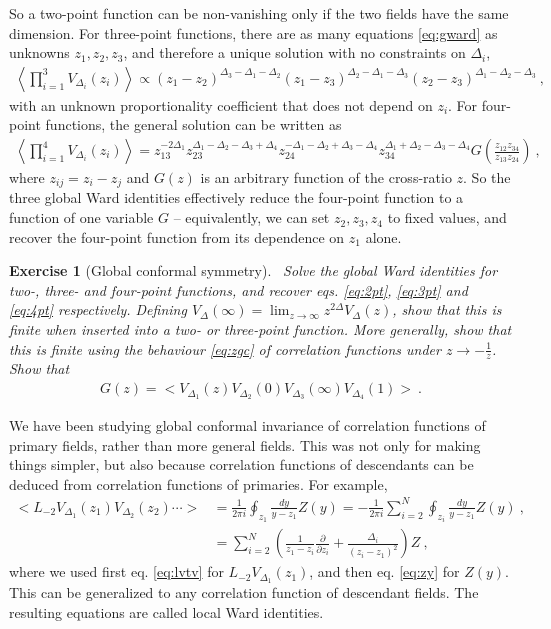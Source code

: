 \documentclass[12pt, a4paper]{article}
\theoremstyle{break}
\newtheorem{exo}{Exercise}[section]
\begin{document}
So a two-point function can be non-vanishing only if the two fields have the same dimension.
For three-point functions, there are as many equations \eqref{eq:gward} as unknowns $z_1,z_2,z_3$, and therefore a unique solution with no constraints on $\Delta_i$,
\begin{align}
 \left< \prod_{i=1}^3 V_{\Delta_i}(z_i) \right> \propto (z_1-z_2)^{\Delta_3-\Delta_1-\Delta_2} (z_1-z_3)^{\Delta_2-\Delta_1-\Delta_3} (z_2-z_3)^{\Delta_1-\Delta_2-\Delta_3}\ ,
 \label{eq:3pt}
\end{align}
with an unknown proportionality coefficient that does not depend on $z_i$.
For four-point functions, the general solution can be written as 
\begin{align}
 \left< \prod_{i=1}^4 V_{\Delta_i}(z_i) \right> 
 = z_{13}^{-2\Delta_1} z_{23}^{\Delta_1-\Delta_2-\Delta_3+\Delta_4} z_{24}^{-\Delta_1-\Delta_2+\Delta_3-\Delta_4} z_{34}^{\Delta_1+\Delta_2-\Delta_3-\Delta_4} G\left(\frac{z_{12}z_{34}}{z_{13}z_{24}}\right)\ ,
 \label{eq:4pt}
\end{align}
where $z_{ij} = z_i - z_j$ and $G(z)$ is an arbitrary function of the cross-ratio $z$. 
So the three global Ward identities effectively reduce the four-point function to a function of one variable $G$ -- equivalently, we can set $z_2,z_3,z_4$ to fixed values, and recover the four-point function from its dependence on $z_1$ alone. 

\begin{exo}[Global conformal symmetry]
~\label{exo:4pt}
Solve the global Ward identities for two-, three- and four-point functions, and recover eqs. \eqref{eq:2pt}, \eqref{eq:3pt} and \eqref{eq:4pt} respectively. 
Defining $V_\Delta(\infty) = \lim_{z\to\infty} z^{2\Delta}V_\Delta(z) $, show that this is finite when inserted into a two- or three-point function. More generally, show that this is finite using the behaviour \eqref{eq:zgc} of correlation functions under $z\to -\frac{1}{z}$. 
 Show that
 \begin{align}
  G(z) = \Big< V_{\Delta_1}(z) V_{\Delta_2}(0)V_{\Delta_3}(\infty)V_{\Delta_4}(1) \Big>\ .
 \end{align}
\end{exo}

We have been studying global conformal invariance of correlation functions of primary fields, rather than more general fields. This was not only for making things simpler, but also because correlation functions of descendants can be deduced from correlation functions of primaries. For example,
\begin{align}
 \Big< L_{-2}V_{\Delta_1}(z_1) V_{\Delta_2}(z_2)\cdots \Big>
  &= \frac{1}{2\pi i}\oint_{z_1} \frac{dy}{y-z_1} Z(y)
  = -\frac{1}{2\pi i} \sum_{i=2}^N \oint_{z_i} \frac{dy}{y-z_1} Z(y)\ ,
  \\
  &  =\sum_{i=2}^N\left(\frac{1}{z_1-z_i}\frac{\partial}{\partial z_i} +\frac{\Delta_i}{(z_i-z_1)^2}\right) Z\ ,
  \label{eq:ltv}
\end{align}
where we used first eq. \eqref{eq:lvtv} for $L_{-2}V_{\Delta_1}(z_1)$, and then eq. \eqref{eq:zy} for $Z(y)$.
This can be generalized to any correlation function of descendant fields. The resulting equations are called local Ward identities.
\end{document}
